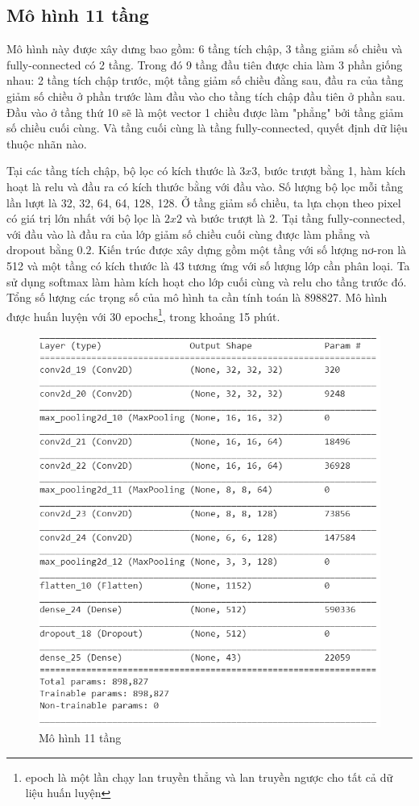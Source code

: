 \subsection{Mô hình 11 tầng}
\label{sec:model1}
Mô hình này được xây dưng bao gồm: 6 tầng tích chập, 3 tầng giảm số chiều và fully-connected có 2 tầng. Trong đó 9 tầng đầu tiên được chia làm 3 phần giống nhau: 2 tầng tích chập trước, một tầng giảm số chiều đằng sau, đầu ra của tầng giảm số chiều ở phần trước làm đầu vào cho tầng tích chập đầu tiên ở phần sau. Đầu vào ở tầng thứ 10 sẽ là một vector 1 chiều được làm "phẳng" bởi tầng giảm số chiều cuối cùng. Và tầng cuối cùng là tầng fully-connected, quyết định dữ liệu thuộc nhãn nào. \par
Tại các tầng tích chập, bộ lọc có kích thước là $3x3$, bước trượt bằng 1, hàm kích hoạt là relu và đầu ra có kích thước bằng với đầu vào. Số lượng bộ lọc mỗi tầng lần lượt là 32, 32, 64, 64, 128, 128. Ở tầng giảm số chiều, ta lựa chọn theo pixel có giá trị lớn nhất với bộ lọc là $2x2$ và bước trượt là 2. Tại tầng fully-connected, với đầu vào là đầu ra của lớp giảm số chiều cuối cùng được làm phẳng và dropout bằng $0.2$. Kiến trúc được xây dựng gồm một tầng với số lượng nơ-ron là 512 và một tầng có kích thước là 43 tương ứng với số lượng lớp cần phân loại. Ta sử dụng softmax làm hàm kích hoạt cho lớp cuối cùng và relu cho tầng trước đó. Tổng số lượng các trọng số của mô hình ta cần tính toán là 898827. Mô hình được huấn luyện với 30 epochs\footnote{epoch là một lần chạy lan truyền thẳng và lan truyền ngược cho tất cả dữ liệu huấn luyện}, trong khoảng 15 phút.
\begin{figure}[H]
\begin{center}
\includegraphics[scale=1]{chap5/image/model/model_endtoend.png}
\end{center}
\caption{Mô hình 11 tầng}
\end{figure}
